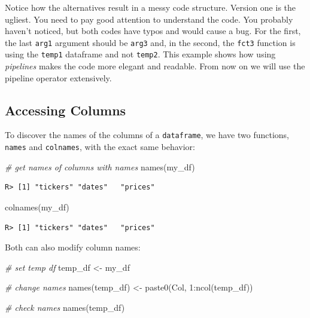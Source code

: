 \documentclass[
  12pt,
]{book}
\newenvironment{Shaded}{\begin{snugshade}}{\end{snugshade}}
\newcommand{\CommentTok}[1]{\textcolor[rgb]{0.37,0.37,0.37}{\textit{#1}}}
\newcommand{\DecValTok}[1]{\textcolor[rgb]{0.06,0.06,0.06}{#1}}
\newcommand{\FunctionTok}[1]{\textcolor[rgb]{0,0,0}{#1}}
\newcommand{\NormalTok}[1]{#1}
\newcommand{\OtherTok}[1]{\textcolor[rgb]{0.37,0.37,0.37}{#1}}
\newcommand{\SpecialCharTok}[1]{\textcolor[rgb]{0,0,0}{#1}}
\newcommand{\StringTok}[1]{\textcolor[rgb]{0.5,0.5,0.5}{#1}}
\begin{document}
Notice how the alternatives result in a messy code structure. Version one is the ugliest. You need to pay good attention to understand the code. You probably haven't noticed, but both codes have typos and would cause a bug. For the first, the last \texttt{arg1} argument should be \texttt{arg3} and, in the second, the \texttt{fct3} function is using the \texttt{temp1} dataframe and not \texttt{temp2}. This example shows how using \emph{pipelines} makes the code more elegant and readable. From now on we will use the pipeline operator extensively.

\hypertarget{accessing-columns}{%
\subsection{Accessing Columns}\label{accessing-columns}}

To discover the names of the columns of a \texttt{dataframe}, we have two functions, \texttt{names} and \texttt{colnames}, with the exact same behavior:  

\begin{Shaded}
\begin{Highlighting}[]
\CommentTok{\# get names of columns with names}
\FunctionTok{names}\NormalTok{(my\_df)}
\end{Highlighting}
\end{Shaded}

\begin{verbatim}
R> [1] "tickers" "dates"   "prices"
\end{verbatim}

\begin{Shaded}
\begin{Highlighting}[]
\FunctionTok{colnames}\NormalTok{(my\_df)}
\end{Highlighting}
\end{Shaded}

\begin{verbatim}
R> [1] "tickers" "dates"   "prices"
\end{verbatim}

Both can also modify column names:

\begin{Shaded}
\begin{Highlighting}[]
\CommentTok{\# set temp df}
\NormalTok{temp\_df }\OtherTok{\textless{}{-}}\NormalTok{ my\_df}

\CommentTok{\# change names}
\FunctionTok{names}\NormalTok{(temp\_df) }\OtherTok{\textless{}{-}} \FunctionTok{paste0}\NormalTok{(}\StringTok{\textquotesingle{}Col\textquotesingle{}}\NormalTok{, }\DecValTok{1}\SpecialCharTok{:}\FunctionTok{ncol}\NormalTok{(temp\_df))}

\CommentTok{\# check names}
\FunctionTok{names}\NormalTok{(temp\_df)}
\end{Highlighting}
\end{Shaded}
\end{document}
